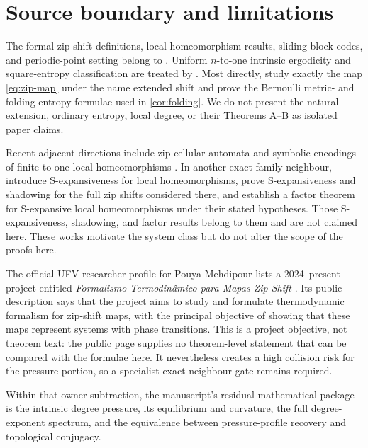 \section{Source boundary and limitations}\label{sec:scope}

The formal zip-shift definitions, local homeomorphism results, sliding block
codes, and periodic-point setting belong to
\citet{LameiMehdipour2025}.  Uniform $n$-to-one intrinsic ergodicity and
square-entropy classification are treated by
\citet{MehdipourJangjooye2025}.  Most directly,
\citet{MartinsMattosVarao2026} study exactly the map \eqref{eq:zip-map} under
the name extended shift and prove the Bernoulli metric- and folding-entropy
formulae used in \cref{cor:folding}.  We do not present the natural extension,
ordinary entropy, local degree, or their Theorems A--B as isolated paper
claims.

Recent adjacent directions include zip cellular automata
\citep{MehdipourSalarinoghabiGibrim2026} and symbolic encodings of finite-to-one
local homeomorphisms \citep{MehdipourLamei2026}.  In another exact-family
neighbour, \citet{LameiMehdipourVargas2025} introduce S-expansiveness for local
homeomorphisms, prove S-expansiveness and shadowing for the full zip shifts
considered there, and establish a factor theorem for S-expansive local
homeomorphisms under their stated hypotheses.  Those S-expansiveness,
shadowing, and factor results belong to them and are not claimed here.  These
works motivate the system class but do not alter the scope of the proofs here.

The official UFV researcher profile for Pouya Mehdipour lists a 2024--present
project entitled \emph{Formalismo Termodin\^amico para Mapas Zip Shift}
\citep{MehdipourUFVProject2024}.  Its public description says that the project
aims to study and formulate thermodynamic formalism for zip-shift maps, with
the principal objective of showing that these maps represent systems with
phase transitions.  This is a project objective, not theorem text: the public
page supplies no theorem-level statement that can be compared with the
formulae here.  It nevertheless creates a high collision risk for the pressure
portion, so a specialist exact-neighbour gate remains required.

Within that owner subtraction, the manuscript's residual mathematical package
is the intrinsic degree pressure, its equilibrium and curvature, the full
degree-exponent spectrum, and the equivalence between pressure-profile
recovery and topological conjugacy.

